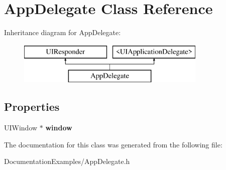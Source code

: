 \hypertarget{interface_app_delegate}{}\section{App\+Delegate Class Reference}
\label{interface_app_delegate}
Inheritance diagram for App\+Delegate\+:\begin{figure}[H]
\begin{center}
\leavevmode
\includegraphics[height=2.000000cm]{dd/d52/interface_app_delegate}
\end{center}
\end{figure}
\subsection*{Properties}
\begin{DoxyCompactItemize}
\item 
\hypertarget{interface_app_delegate_acf48ac24125e688cac1a85445cd7fac2}{}U\+I\+Window $\ast$ {\bfseries window}\label{interface_app_delegate_acf48ac24125e688cac1a85445cd7fac2}

\end{DoxyCompactItemize}


The documentation for this class was generated from the following file\+:\begin{DoxyCompactItemize}
\item 
Documentation\+Examples/App\+Delegate.\+h\end{DoxyCompactItemize}
